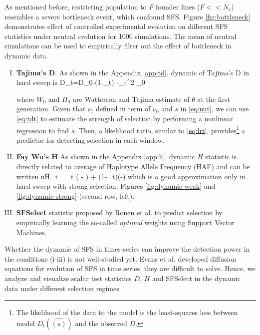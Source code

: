 \documentclass[11pt]{article}
\begin{document}
As mentioned before, restricting population to $F$ founder lines ($F<<N_e$) 
resembles a severe bottleneck event, which confound SFS. Figure 
\ref{fig:bottleneck} demonstrates effect of controlled experimental evolution 
on different SFS statistics under neutral evolution for 1000 simulations. The 
mean of 
neutral simulations can be used to empirically filter out the effect of 
bottleneck in dynamic data. 

\begin{enumerate}[I.]
	\item {\bf Tajima's D}. As shown in the Appendix \ref{app:td}, dynamic of 
	Tajima's D in hard sweep is
	\beq
	D_t=D_0-\log(1-\nu_t)  -\nu_t^2 \Pi_0\label{eq:tdt}
	\eeq
	
	where $W_0$ and $\Pi_0$ are Watterson and Tajima estimate 
	of $\theta$ at 
	the first generation.
	Given that $\nu_t$ defined in term of $\nu_0$ and $s$ in 
	\eqref{eq:nut}, we 
	can use \eqref{eq:tdt} to estimate the strength of 
	selection by performing a nonlinear 
	regression to find 
	$s$. Then, a likelihood ratio, similar to \eqref{eq:lrt}, 
	provides\footnote{The 
		likelihood of the data to the model is the least-squares 
		loss between model 
		$D_t(\hat{(s)})$ and the observed $D$.} a predictor for 
	detecting selection in each window. 
	
	
	
	\item {\bf Fay Wu's H} As shown in the Appendix \ref{app:h}, dynamic $H$ 
	statistic is directly related to average of Haplotype Allele Frequency 
	(HAF) \cite{ronen2015predicting} and 
	can be written
	\beq
	nH_t= \theta \nu_t \left( - \right) +
	\theta (1-\nu_t)\left(-\right) 
	\label{eq:ht}
	\eeq
	which is a good approximation only in hard sweep with strong selection, 
	Figures 
	\ref{fig:dynamic-weak} and \ref{fig:dynamic-strong} (second
	row, left). 
	

	
	\item {\bf SFSelect} statistic proposed by Ronen et 
	al. \cite{ronen2013learning} to predict selection by empirically learning 
	the so-called \emph{optimal} weights using Support Vector Machines. 
\end{enumerate}

Whether the dynamic of SFS in times-series can improve the detection power in 
the conditions (i-iii) is not well-studied yet. Evans et al. 
\cite{evans2007non} developed diffusion equations for 
evolution of SFS in time series, they are difficult to solve. 
Hence, we analyze and visualize scalar test statistics $D$, $H$ and SFSelect 
in the dynamic data under different selection regimes.
\end{document}
